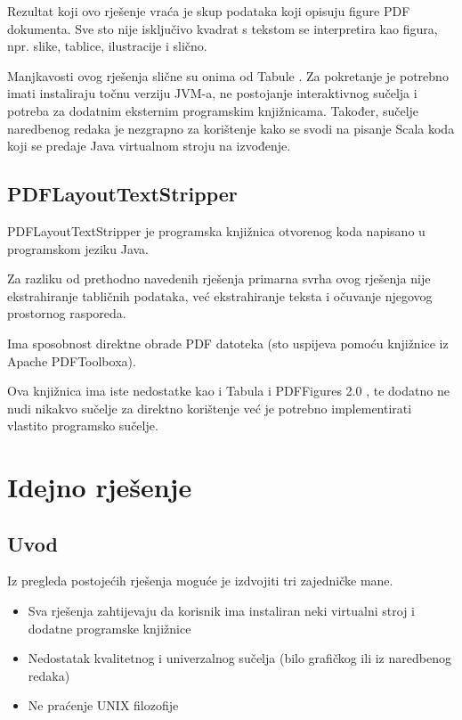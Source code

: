 \documentclass[times, utf8, zavrsni]{fer}
\begin{document}
Rezultat koji ovo rješenje vraća je skup podataka koji opisuju figure PDF
dokumenta. Sve sto nije isključivo kvadrat s tekstom se interpretira kao
figura, npr. slike, tablice, ilustracije i slično.

Manjkavosti ovog rješenja slične su onima od Tabule \cite{tabula_repository}.
Za pokretanje je potrebno
imati instaliraju točnu verziju JVM-a, ne postojanje interaktivnog sučelja i
potreba za dodatnim eksternim programskim knjižnicama. Također, sučelje
naredbenog redaka je nezgrapno za korištenje kako se svodi na pisanje Scala koda
koji se predaje Java virtualnom stroju na izvođenje.

\section{PDFLayoutTextStripper}

PDFLayoutTextStripper \cite{pdflayouttextstripper_repository} je programska
knjižnica otvorenog koda napisano u programskom jeziku Java.

Za razliku od prethodno navedenih rješenja primarna svrha ovog rješenja nije
ekstrahiranje tabličnih podataka, već ekstrahiranje teksta i očuvanje njegovog
prostornog rasporeda.

Ima sposobnost direktne obrade PDF datoteka (sto uspijeva pomoću knjižnice iz
Apache PDFToolboxa).

Ova knjižnica ima iste nedostatke kao i Tabula \cite{tabula_repository} i
PDFFigures 2.0 \cite{pdffigures_2_repository}, te dodatno ne
nudi nikakvo sučelje za direktno korištenje već je potrebno implementirati
vlastito programsko sučelje.



\chapter{Idejno rješenje}

\section{Uvod}

Iz pregleda postojećih rješenja moguće je izdvojiti tri zajedničke mane.

\begin{itemize}
  \item Sva rješenja zahtijevaju da korisnik ima instaliran neki virtualni
    stroj i dodatne  programske knjižnice
  \item Nedostatak kvalitetnog i univerzalnog sučelja (bilo grafičkog ili iz
    naredbenog redaka)
  \item Ne praćenje UNIX filozofije \cite{unix_philosophy}
\end{itemize}
\end{document}
